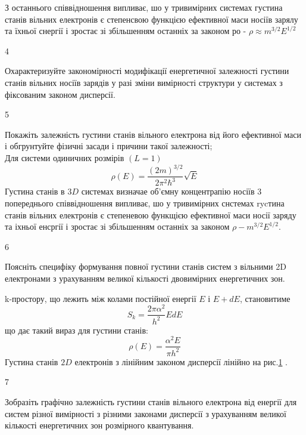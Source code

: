 \documentclass[a4paper,14pt]{extreport}
\begin{document}
З останнього співвідношення випливає, шо у тривимірних системах густина
станів вільних електронів є степенсвою функцією ефективної маси носіїв зарялу та їхньої снергії і зростає зі збільшенням останніх за законом ро - $\rho \approx m^{3/2}E^{1/2}$


\begin{center}4\end{center}
Охарактеризуйте закономірності модифікації енергетичної залежності густини станів вільних носіїв зарядів у разі зміни вимірності структури у системах з фіксованим законом дисперсії.\\


\begin{center}5\end{center}
Покажіть залежність густини станів вільного електрона від його ефективної маси і обгрунтуйте фізичні засади і причини такої залежності;\\

Для системи одиничних розмірів $(L=1)$
$$
\rho(E)=\frac{(2 m)^{3 / 2}}{2 \pi^{2} \hbar^{3}} \sqrt{E}
$$
Густина станів в $3 D$ системах визначае об'ємну концентрапію носіїв
3 попереднього співвідношення  випливає, шо у тривимірних снстемах rycтина станів вільних електронів є степеневою функщією ефективної маси носії заряду та іхньої енсргії і зростає зі збільшенням останніх за законом $\rho - m^{3 / 2} E^{1 / 2}$.

\begin{center}6\end{center}
Поясніть специфіку формування повної густини станів  систем з вільними 2D електронами з урахуванням великої кількості двовимірних енергетичних  зон.\\

\begin{figure}[h]
\label{ris1}
\end{figure}
k-простору, що лежить між колами постійної енергії $E$ і $E+d E$, становитиме
$$
S_{k}=\frac{2 \pi \alpha^{2}}{h^{2}} E d E
$$
що дає такий вираз для густини станів:
$$
\rho(E)=\frac{\alpha^{2} E}{\pi h^{2}}
$$
Густина станів $2 D$ електронів з лінійним законом дисперсії лінійно
на рис.\ref{ris1} .


\begin{center}7\end{center}
Зобразіть графічно залежність густини станів вільного електрона від енергії для систем різної вимірності  з різними законами дисперсії з урахуванням великої кількості енергетичних зон розмірного квантування.
\end{document}
